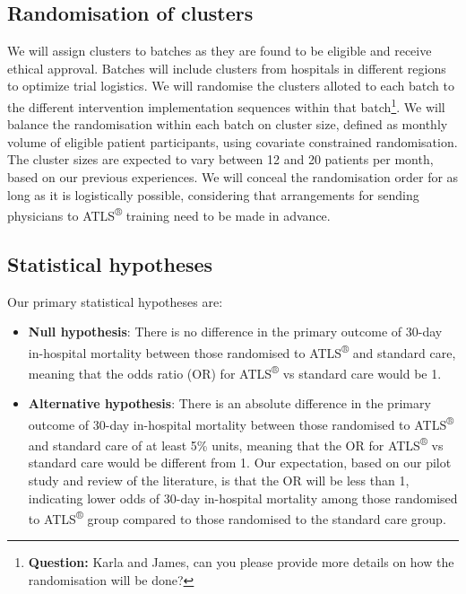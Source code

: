 \documentclass[
]{scrartcl}
\providecommand{\tightlist}{%
  \setlength{\itemsep}{0pt}\setlength{\parskip}{0pt}}\usepackage{longtable,booktabs,array}
\begin{document}
\hypertarget{randomisation-of-clusters}{%
\subsection{Randomisation of clusters}\label{randomisation-of-clusters}}

We will assign clusters to batches as they are found to be eligible and
receive ethical approval. Batches will include clusters from hospitals
in different regions to optimize trial logistics. We will randomise the
clusters alloted to each batch to the different intervention
implementation sequences within that batch\footnote{\textbf{Question:}
  Karla and James, can you please provide more details on how the
  randomisation will be done?}. We will balance the randomisation within
each batch on cluster size, defined as monthly volume of eligible
patient participants, using covariate constrained randomisation. The
cluster sizes are expected to vary between 12 and 20 patients per month,
based on our previous experiences. We will conceal the randomisation
order for as long as it is logistically possible, considering that
arrangements for sending physicians to ATLS\textsuperscript{®} training
need to be made in advance.

\hypertarget{statistical-hypotheses}{%
\subsection{Statistical hypotheses}\label{statistical-hypotheses}}

Our primary statistical hypotheses are:

\begin{itemize}
\tightlist
\item
  \textbf{Null hypothesis}: There is no difference in the primary
  outcome of 30-day in-hospital mortality between those randomised to
  ATLS\textsuperscript{®} and standard care, meaning that the odds ratio
  (OR) for ATLS\textsuperscript{®} vs standard care would be 1.
\item
  \textbf{Alternative hypothesis}: There is an absolute difference in
  the primary outcome of 30-day in-hospital mortality between those
  randomised to ATLS\textsuperscript{®} and standard care of at least
  5\% units, meaning that the OR for ATLS\textsuperscript{®} vs standard
  care would be different from 1. Our expectation, based on our pilot
  study and review of the literature, is that the OR will be less than
  1, indicating lower odds of 30-day in-hospital mortality among those
  randomised to ATLS\textsuperscript{®} group compared to those
  randomised to the standard care group.
\end{itemize}
\end{document}
